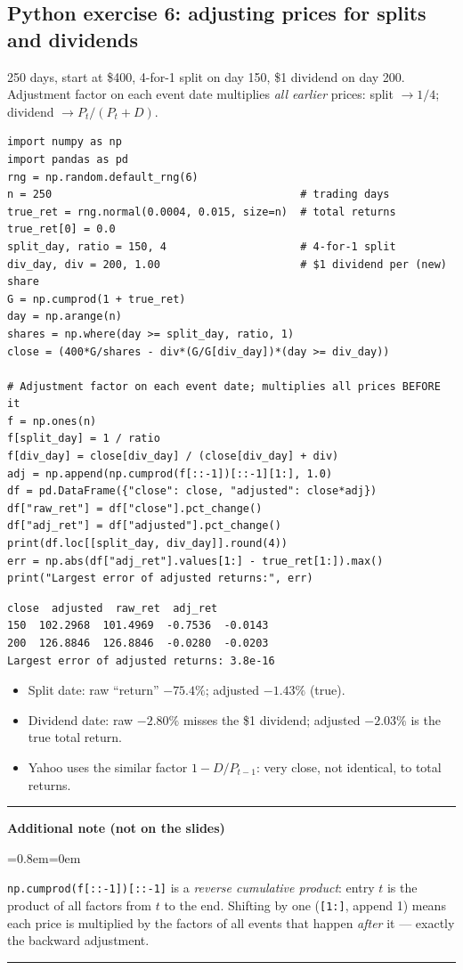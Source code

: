 \documentclass[11pt,a4paper]{report}
\newenvironment{notebox}[1]
  {\par\medskip\Needspace{6\baselineskip}\noindent\rule{\linewidth}{0.4pt}\par\nopagebreak
   \noindent\textbf{#1}\par\nopagebreak
   \begin{list}{}{\leftmargin=0.8em\rightmargin=0em\topsep=2pt}\item[]}
  {\end{list}\nopagebreak\noindent\rule{\linewidth}{0.4pt}\par\medskip}
\newenvironment{addnote}{\begin{notebox}{Additional note (not on the slides)}}{\end{notebox}}
\begin{document}
\subsection*{Python exercise 6: adjusting prices for splits and dividends}
250 days, start at \$400, 4-for-1 split on day 150, \$1 dividend on day 200.
Adjustment factor on each event date multiplies \emph{all earlier} prices:
split $\to 1/4$; dividend $\to P_t/(P_t+D)$.
\begin{lstlisting}
import numpy as np
import pandas as pd
rng = np.random.default_rng(6)
n = 250                                       # trading days
true_ret = rng.normal(0.0004, 0.015, size=n)  # total returns
true_ret[0] = 0.0
split_day, ratio = 150, 4                     # 4-for-1 split
div_day, div = 200, 1.00                      # $1 dividend per (new) share
G = np.cumprod(1 + true_ret)
day = np.arange(n)
shares = np.where(day >= split_day, ratio, 1)
close = (400*G/shares - div*(G/G[div_day])*(day >= div_day))

# Adjustment factor on each event date; multiplies all prices BEFORE it
f = np.ones(n)
f[split_day] = 1 / ratio
f[div_day] = close[div_day] / (close[div_day] + div)
adj = np.append(np.cumprod(f[::-1])[::-1][1:], 1.0)
df = pd.DataFrame({"close": close, "adjusted": close*adj})
df["raw_ret"] = df["close"].pct_change()
df["adj_ret"] = df["adjusted"].pct_change()
print(df.loc[[split_day, div_day]].round(4))
err = np.abs(df["adj_ret"].values[1:] - true_ret[1:]).max()
print("Largest error of adjusted returns:", err)
\end{lstlisting}
\begin{lstlisting}[style=out]
        close  adjusted  raw_ret  adj_ret
150  102.2968  101.4969  -0.7536  -0.0143
200  126.8846  126.8846  -0.0280  -0.0203
Largest error of adjusted returns: 3.8e-16
\end{lstlisting}
\begin{itemize}
  \item Split date: raw ``return'' $-75.4\%$; adjusted $-1.43\%$ (true).
  \item Dividend date: raw $-2.80\%$ misses the \$1 dividend; adjusted
    $-2.03\%$ is the true total return.
  \item Yahoo uses the similar factor $1-D/P_{t-1}$: very close, not identical,
    to total returns.
\end{itemize}
\begin{addnote}
\texttt{np.cumprod(f[::-1])[::-1]} is a \emph{reverse cumulative product}:
entry $t$ is the product of all factors from $t$ to the end. Shifting by one
(\texttt{[1:]}, append 1) means each price is multiplied by the factors of all
events that happen \emph{after} it --- exactly the backward adjustment.
\end{addnote}
\end{document}
